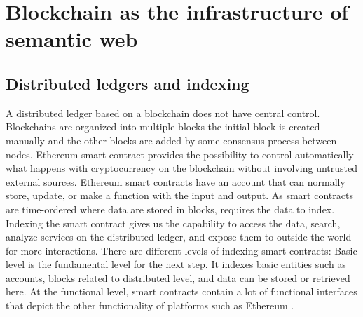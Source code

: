 \chapter{Blockchain as the infrastructure of semantic web}

\section{Distributed ledgers and indexing}
A distributed ledger based on a blockchain does not have central control. Blockchains are organized into multiple blocks the initial block is created manually and the other blocks are added by some consensus process between nodes.
Ethereum smart contract provides the possibility to control automatically what happens with cryptocurrency on the blockchain without involving untrusted external sources. Ethereum smart contracts have an account that can normally store, update, or make a function with the input and output.
As smart contracts are time-ordered where data are stored in blocks,  requires the data to index. Indexing the smart contract gives us the capability to access the data, search, analyze services on the distributed ledger, and expose them to outside the world for more interactions.
There are different levels of indexing smart contracts: Basic level is the fundamental level for the next step. It indexes basic entities such as accounts, blocks related to distributed level, and data can be stored or retrieved here. At the functional level, smart contracts contain a lot of functional interfaces that depict the other functionality of platforms such as Ethereum \cite{Third}. 


